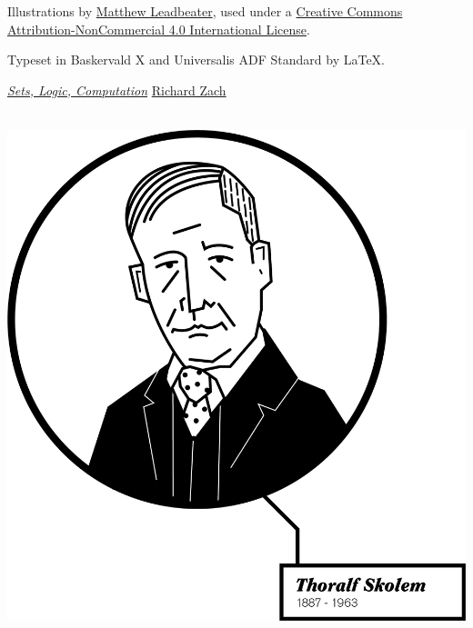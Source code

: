 \vfill


\noindent Illustrations by \href{http://mattleadbeater.com}{Matthew
  Leadbeater}, used under a
\href{http://creativecommons.org/licenses/by-nc/4.0/}{Creative Commons
  Attribution-NonCommercial 4.0 International License}.

\vfill

\noindent Typeset in Baskervald X and Universalis ADF Standard by
\LaTeX.

\vfill


\renewcommand{\ollicensefont}{\fontsize{9pt}{12pt}\selectfont}

\noindent
\oluselicense
{\href{https://github.com/rzach/phil379}{\textit{Sets, Logic,
Computation}}}
{\href{http://richardzach.org/}{Richard Zach}}

\newpage
\pagestyle{leadbeater}
\tableofcontents*

\cleartoverso
\thispagestyle{empty}
\ \vfill
\noindent\hskip-1cm\includegraphics{illustrations/SkolemChapter}
\vfill

